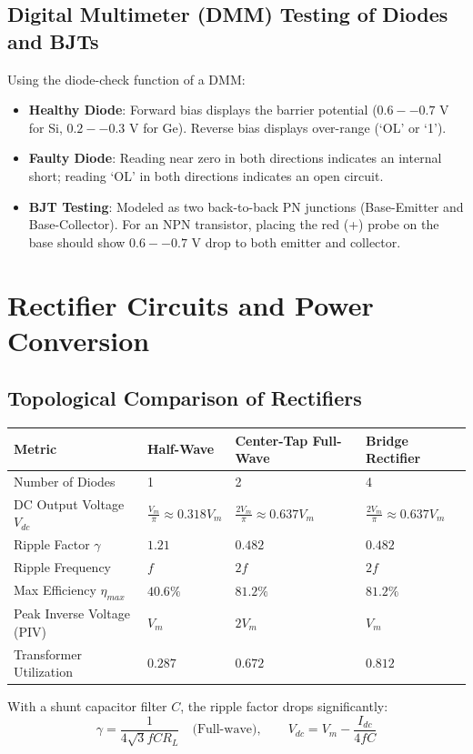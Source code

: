 \subsection{Digital Multimeter (DMM) Testing of Diodes and BJTs}
Using the diode-check function of a DMM:
\begin{itemize}[leftmargin=1.5em]
    \item \textbf{Healthy Diode}: Forward bias displays the barrier potential ($0.6--0.7\text{ V}$ for Si, $0.2--0.3\text{ V}$ for Ge). Reverse bias displays over-range (`OL' or `1').
    \item \textbf{Faulty Diode}: Reading near zero in both directions indicates an internal short; reading `OL' in both directions indicates an open circuit.
    \item \textbf{BJT Testing}: Modeled as two back-to-back PN junctions (Base-Emitter and Base-Collector). For an NPN transistor, placing the red (+) probe on the base should show $0.6--0.7\text{ V}$ drop to both emitter and collector.
\end{itemize}

\section{Rectifier Circuits and Power Conversion}

\subsection{Topological Comparison of Rectifiers}
\begin{center}\small
\begin{tabularx}{\linewidth}{l X X X}
\toprule
\textbf{Metric} & \textbf{Half-Wave} & \textbf{Center-Tap Full-Wave} & \textbf{Bridge Rectifier} \\
\midrule
Number of Diodes & 1 & 2 & 4 \\
DC Output Voltage $V_{dc}$ & $\frac{V_m}{\pi} \approx 0.318 V_m$ & $\frac{2V_m}{\pi} \approx 0.637 V_m$ & $\frac{2V_m}{\pi} \approx 0.637 V_m$ \\
Ripple Factor $\gamma$ & $1.21$ & $0.482$ & $0.482$ \\
Ripple Frequency & $f$ & $2f$ & $2f$ \\
Max Efficiency $\eta_{max}$ & $40.6\%$ & $81.2\%$ & $81.2\%$ \\
Peak Inverse Voltage (PIV) & $V_m$ & $2V_m$ & $V_m$ \\
Transformer Utilization & $0.287$ & $0.672$ & $0.812$ \\
\bottomrule
\end{tabularx}
\end{center}\vspace{2mm}
\noindent
With a shunt capacitor filter $C$, the ripple factor drops significantly:
\begin{equation}
\gamma = \frac{1}{4\sqrt{3} f C R_L} \quad \text{(Full-wave)}, \qquad V_{dc} = V_m - \frac{I_{dc}}{4 f C}
\end{equation}

